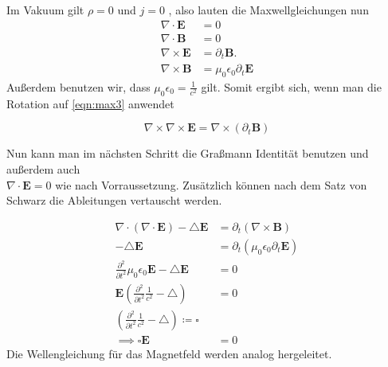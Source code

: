 Im Vakuum gilt $\rho = 0$ und $j=0$ , also lauten die Maxwellgleichungen
nun
\begin{align}
  \nabla \cdot \symbf{E} &= 0\\
    \nabla \cdot \symbf{B} &= 0\\
      \nabla \times \symbf{E} &= \partial_{t} \symbf{B} .
      \label{eqn:max3} \\
        \nabla \times \symbf{B} &= \mu_{0} \epsilon_{0}
          \partial_{t} \symbf{E}
\end{align}
Außerdem benutzen wir, dass $\mu_{0} \epsilon_{0}=\frac{1}{c^2}$ gilt.
Somit ergibt sich, wenn man die Rotation auf \eqref{eqn:max3} anwendet

\begin{equation}
  \nabla \times \nabla \times \symbf{E} = \nabla \times
  \left (\partial_{t} \symbf{B} \right)
\end{equation}

Nun kann man im nächsten Schritt die Graßmann Identität
benutzen und außerdem auch\\
$\nabla \cdot \symbf{E} = 0$ wie nach Vorraussetzung.
Zusätzlich können nach dem Satz von Schwarz die Ableitungen
vertauscht werden.

\begin{align}
  \nabla \cdot \left(\nabla \cdot \symbf{E} \right)-
  \triangle \symbf{E} &= \partial_{t}
  \left(\nabla \times \symbf{B} \right)\\
  - \triangle \symbf{E} &= \partial_{t} \left (\mu_{0} \epsilon_{0}
  \partial_{t} \symbf{E} \right)\\
  \frac{\partial^2}{\partial t^2} \mu_{0} \epsilon_{0} \symbf{E} -
  \triangle \symbf{E} &= 0 \\
  \symbf{E} \left(\frac{\partial^2}{\partial t^2}
  \frac{1}{c^2}-\triangle \right) &= 0\\
  \left(\frac{\partial^2}{\partial t^2}
  \frac{1}{c^2}-\triangle \right) \coloneq \square\\
  \implies \square \symbf{E} &= 0
\end{align}
Die Wellengleichung für das Magnetfeld werden analog
hergeleitet.
